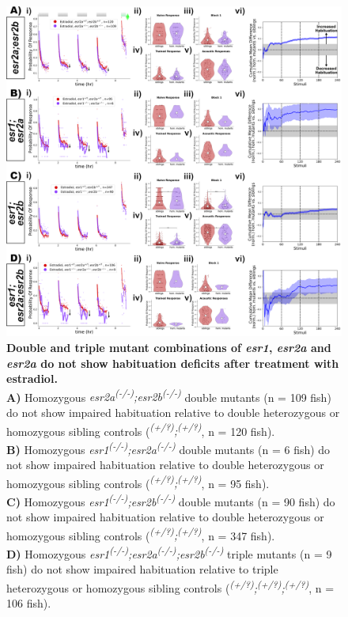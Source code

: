 \documentclass[9.5pt,lineno]{RandlettLab_elife}
\begin{document}
{\begin{figure}
\begin{fullwidth}
\begin{center}
\includegraphics[width=0.70\linewidth]{figures/NuclearDoubleAndTripleMutants.png}
\caption{ \textbf{Double and triple mutant combinations of \emph{esr1}, \emph{esr2a} and \emph{esr2a} do not show habituation deficits after treatment with estradiol.} \scriptsize
\\ \textbf{A)} Homozygous \emph{esr2a\textsuperscript{(-/-)};esr2b\textsuperscript{(-/-)}} double mutants (n = 109 fish) do not show impaired habituation relative to double heterozygous or homozygous sibling controls (\emph{\textsuperscript{(+/?)};\textsuperscript{(+/?)}}, n = 120 fish). 
\\ \textbf{B)} Homozygous \emph{esr1\textsuperscript{(-/-)};esr2a\textsuperscript{(-/-)}} double mutants (n = 6 fish) do not show impaired habituation relative to double heterozygous or homozygous sibling controls (\emph{\textsuperscript{(+/?)};\textsuperscript{(+/?)}}, n = 95 fish). 
\\ \textbf{C)} Homozygous \emph{esr1\textsuperscript{(-/-)};esr2b\textsuperscript{(-/-)}} double mutants (n = 90 fish) do not show impaired habituation relative to double heterozygous or homozygous sibling controls (\emph{\textsuperscript{(+/?)};\textsuperscript{(+/?)}}, n = 347 fish). 
\\ \textbf{D)} Homozygous \emph{esr1\textsuperscript{(-/-)};esr2a\textsuperscript{(-/-)};esr2b\textsuperscript{(-/-)}} triple mutants (n = 9 fish) do not show impaired habituation relative to triple heterozygous or homozygous sibling controls (\emph{\textsuperscript{(+/?)};\textsuperscript{(+/?)};\textsuperscript{(+/?)}}, n = 106 fish). 
}
\end{center}
\end{fullwidth}
\end{figure}}
\end{document}
